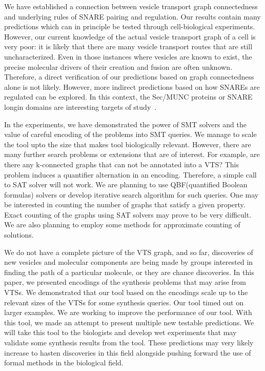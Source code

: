 \noindent 
%
We have established a connection between vesicle transport graph connectedness and underlying rules of SNARE pairing and regulation. 
%
Our results contain many predictions which can in
principle be tested through cell-biological experiments. 
%
However, our current knowledge of the actual vesicle transport graph of a cell is very poor: it is likely that there are many vesicle transport routes that are still uncharacterized. Even in those instances where vesicles are known to exist, the precise molecular drivers of their creation and fusion are often unknown.
%
Therefore, a direct verification of our predictions based on graph connectedness alone is not likely. 
%
However, more indirect predictions based on how SNAREs are regulated can be
explored. 
%
In this context, the Sec/MUNC proteins or SNARE longin domains are interesting
targets of study~\cite{van2010one,rossi2004longins}.

In the experiments, we have demonstrated the power of SMT solvers and the
value of careful encoding of the problems into SMT queries. 
%
We manage to scale the tool upto the size that makes tool biologically relevant. However, there are many further search problems or extensions that are of interest. 
%
For example, are there any k-connected graphs that can not be annotated into a VTS? 
%
This problem induces a quantifier alternation in an encoding. Therefore, a simple call to SAT solver will not work. 
%
We are planning to use QBF(quantified Boolean
formulas) solvers or develop iterative search algorithm for such queries.
%
One may be interested in counting the number of graphs that satisfy a given
property. 
%
Exact counting of the graphs using SAT solvers may prove to be very
difficult. 
%
We are also planning to employ some methods for approximate counting
of solutions.

We do not have a complete picture of the VTS graph, and so far, discoveries of new vesicles and molecular components are being made by groups interested in finding the path of a particular molecule, or they are chance discoveries. 
%
In this paper, we presented encodings of the synthesis problems
that may arise from VTSs.
%
%
We demonstrated that our tool based on the encodings
scale up to the relevant sizes of the VTSs for some synthesis queries.
%
Our tool timed out on larger examples.
%
We are working to improve the performance of our tool.
%
%
With this tool, we made an attempt to present multiple new testable predictions. 
%
We will take this tool to the biologists and develop wet experiments that may validate some synthesis results from the tool.
%
These predictions may very likely increase to hasten discoveries in this field alongside pushing forward the use of formal methods in the biological field.

